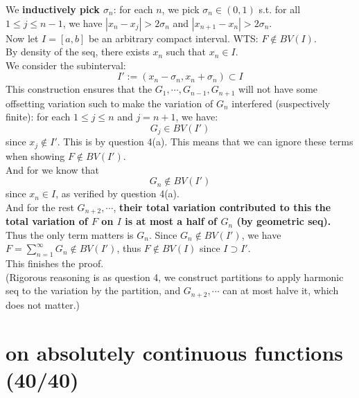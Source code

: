 \documentclass[lang=cn,11pt]{elegantbook}
\begin{document}
\begin{solution}
We \textbf{inductively pick $\sigma_n$}: for each $n$, we pick $\sigma_n \in (0,1)$ s.t. for all $1 \leq j \leq n-1$, we have $|x_n - x_j| > 2\sigma_n$ and $|x_{n+1} - x_n | > 2 \sigma_n$.\\ 
Now let $I = [a,b]$ be an arbitrary compact interval. WTS: $F \not \in BV(I)$. \\
By density of the seq, there exists $x_n$ such that $x_n \in I$.\\
We consider the subinterval: \[
I' :=(x_n - \sigma_n, x_n + \sigma_n) \subset I
\]
This construction ensures that the $G_1,\cdots,G_{n-1}, G_{n+1}$ will not have some offsetting variation such to make the variation of $G_n$ interfered (suspectively finite): for each $1 \leq j \leq n$ and $j = n+1$, we have: \[
G_j \in BV(I')
\]
since $x_j \not \in I'$. This is by question 4(a). This means that we can ignore these terms when showing $F \not \in  BV(I')$.\\
And for we know that \[
G_n  \not \in BV(I')
\]
since $x_n \in I$, as verified by question 4(a).\\
And for the rest $G_{n+2},\cdots$, \textbf{their total variation contributed to this the total variation of $F$ on $I$ is at most a half of $G_n$ (by geometric seq).}\\
Thus the only term matters is $G_n$. Since $G_n\not \in BV(I')$, we have $F = \sum_{n=1}^\infty  G_n \not \in BV(I')$, thus $F \not \in BV(I)$ since $I \supset I'$.\\
This finishes the proof.\\
(Rigorous reasoning is as question 4, we construct partitions to apply harmonic seq to the variation by the partition, and $G_{n+2},\cdots$ can at most halve it, which does not matter.)


\end{solution}










\chapter{on absolutely continuous functions (40/40)}

 
\end{document}
